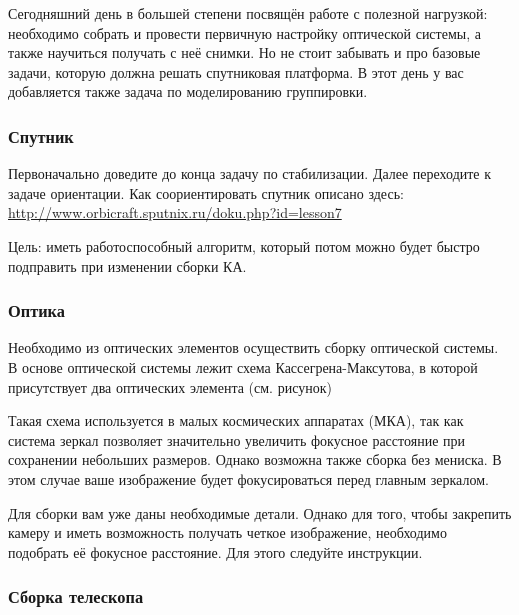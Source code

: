Сегодняшний день в большей степени посвящён работе с полезной нагрузкой: необходимо собрать и провести первичную настройку оптической системы, а также научиться получать с неё снимки. Но не стоит забывать и про базовые задачи, которую должна решать спутниковая платформа. В этот день у вас добавляется также задача по моделированию группировки.

\subsubsection*{Спутник}

Первоначально доведите до конца задачу по стабилизации. Далее переходите к задаче ориентации. Как соориентировать спутник описано здесь: \url{http://www.orbicraft.sputnix.ru/doku.php?id=lesson7}

Цель: иметь работоспособный алгоритм, который потом можно будет быстро подправить при изменении сборки КА.

\subsubsection*{Оптика}

Необходимо из оптических элементов осуществить сборку оптической системы. В основе оптической системы лежит схема Кассегрена-Максутова, в которой присутствует два оптических элемента (см. рисунок)


Такая схема используется в малых космических аппаратах (МКА), так как система зеркал позволяет значительно увеличить фокусное расстояние при сохранении небольших размеров. Однако возможна также сборка без мениска. В этом случае ваше изображение будет фокусироваться перед главным зеркалом.

Для сборки вам уже даны необходимые детали. Однако для того, чтобы закрепить камеру и иметь возможность получать четкое изображение, необходимо подобрать её фокусное расстояние. Для этого следуйте инструкции.

\subsubsection*{Сборка телескопа}

